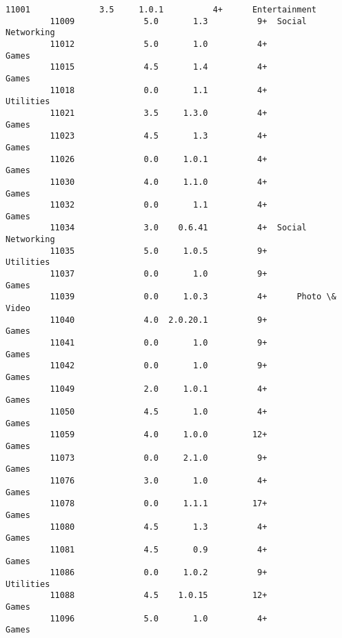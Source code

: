 \documentclass[11pt]{article}
\begin{document}
\begin{Verbatim}[commandchars=\\\{\}]
         11001              3.5     1.0.1          4+      Entertainment   
         11009              5.0       1.3          9+  Social Networking   
         11012              5.0       1.0          4+              Games   
         11015              4.5       1.4          4+              Games   
         11018              0.0       1.1          4+          Utilities   
         11021              3.5     1.3.0          4+              Games   
         11023              4.5       1.3          4+              Games   
         11026              0.0     1.0.1          4+              Games   
         11030              4.0     1.1.0          4+              Games   
         11032              0.0       1.1          4+              Games   
         11034              3.0    0.6.41          4+  Social Networking   
         11035              5.0     1.0.5          9+          Utilities   
         11037              0.0       1.0          9+              Games   
         11039              0.0     1.0.3          4+      Photo \& Video   
         11040              4.0  2.0.20.1          9+              Games   
         11041              0.0       1.0          9+              Games   
         11042              0.0       1.0          9+              Games   
         11049              2.0     1.0.1          4+              Games   
         11050              4.5       1.0          4+              Games   
         11059              4.0     1.0.0         12+              Games   
         11073              0.0     2.1.0          9+              Games   
         11076              3.0       1.0          4+              Games   
         11078              0.0     1.1.1         17+              Games   
         11080              4.5       1.3          4+              Games   
         11081              4.5       0.9          4+              Games   
         11086              0.0     1.0.2          9+          Utilities   
         11088              4.5    1.0.15         12+              Games   
         11096              5.0       1.0          4+              Games   
         

\end{Verbatim}
\end{document}
